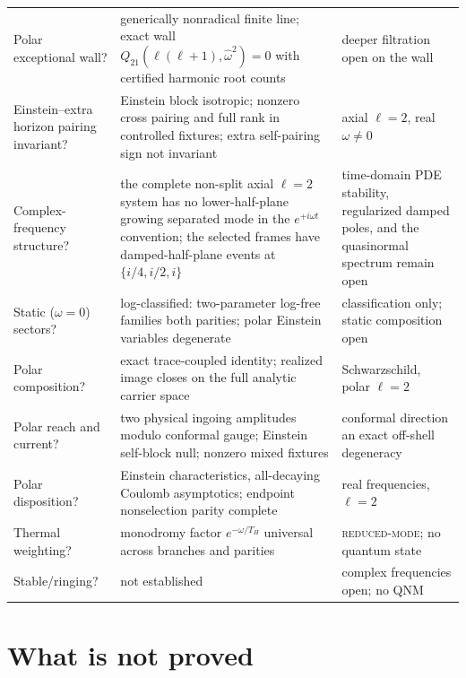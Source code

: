 \documentclass[11pt]{article}
\theoremstyle{definition}
\theoremstyle{remark}
\begin{document}
{\begin{center}
\begin{tabularx}{0.98\textwidth}{@{}Y Y Y@{}}
Polar exceptional wall? & generically nonradical finite line; exact wall
$Q_{21}(\ell(\ell+1),\widehat\omega^2)=0$ with certified harmonic root counts &
deeper filtration open on the wall\\
Einstein--extra horizon pairing invariant? & Einstein block isotropic;
nonzero cross pairing and full rank in controlled fixtures; extra self-pairing
sign not invariant & axial $\ell=2$, real $\omega\neq0$\\
Complex-frequency structure? & the complete non-split axial $\ell=2$
system has no lower-half-plane growing separated mode in the
$e^{+i\omega t}$ convention;
the selected frames have damped-half-plane events at
$\{i/4,i/2,i\}$ & time-domain PDE stability, regularized damped poles, and
the quasinormal spectrum remain open\\
Static ($\omega=0$) sectors? & log-classified: two-parameter log-free
families both parities; polar Einstein variables degenerate &
classification only; static composition open\\
Polar composition? & exact trace-coupled identity; realized image closes on
the full analytic carrier space & Schwarzschild, polar $\ell=2$\\
Polar reach and current? & two physical ingoing amplitudes modulo conformal
gauge; Einstein self-block null; nonzero mixed fixtures & conformal
direction an exact off-shell degeneracy\\
Polar disposition? & Einstein characteristics, all-decaying Coulomb
asymptotics; endpoint nonselection parity complete & real frequencies,
$\ell=2$\\
Thermal weighting? & monodromy factor $e^{-\omega/T_H}$ universal across
branches and parities & \textsc{reduced-mode}; no quantum state\\
Stable/ringing? & not established & complex frequencies open; no QNM\\
\bottomrule
\end{tabularx}
\end{center}
}

\section{What is not proved}
\end{document}
